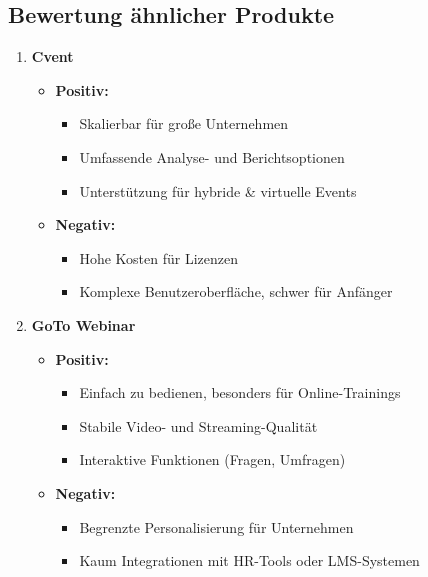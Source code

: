 \documentclass[a4paper,12pt]{article}
\begin{document}
\subsection{Bewertung ähnlicher Produkte}
\begin{enumerate}
  \item \textbf{Cvent}
  \begin{itemize}
      \item \textbf{Positiv:}
      \begin{itemize}
          \item Skalierbar für große Unternehmen
          \item Umfassende Analyse- und Berichtsoptionen
          \item Unterstützung für hybride \& virtuelle Events
      \end{itemize}
      \item \textbf{Negativ:}
      \begin{itemize}
          \item Hohe Kosten für Lizenzen
          \item Komplexe Benutzeroberfläche, schwer für Anfänger
      \end{itemize}
  \end{itemize}
  
  \item \textbf{GoTo Webinar}
  \begin{itemize}
      \item \textbf{Positiv:}
      \begin{itemize}
          \item Einfach zu bedienen, besonders für Online-Trainings
          \item Stabile Video- und Streaming-Qualität
          \item Interaktive Funktionen (Fragen, Umfragen)
      \end{itemize}
      \item \textbf{Negativ:}
      \begin{itemize}
          \item Begrenzte Personalisierung für Unternehmen
          \item Kaum Integrationen mit HR-Tools oder LMS-Systemen
      \end{itemize}
  \end{itemize}
  

\end{enumerate}
\end{document}
